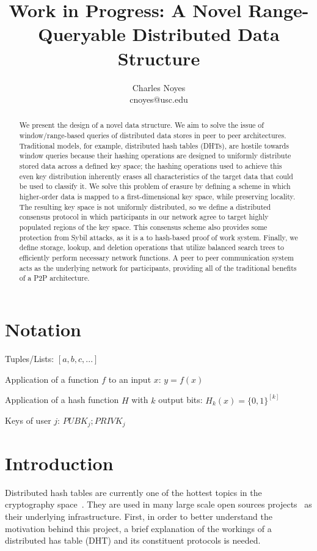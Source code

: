 \documentclass[10pt]{IEEEtran}
\title{Work in Progress: A Novel Range-Queryable Distributed Data Structure}
\author{Charles Noyes \\ cnoyes@usc.edu}
\date{\vspace{-5ex}}
\begin{document}
\maketitle

\begin{abstract}
We present the design of a novel data structure. We aim to solve the issue of window/range-based queries of distributed data stores in peer to peer architectures. Traditional models, for example, distributed hash tables (DHTs), are hostile towards window queries because their hashing operations are designed to uniformly distribute stored data across a defined key space; the hashing operations used to achieve this even key distribution inherently erases all characteristics of the target data that could be used to classify it. We solve this problem of erasure by defining a scheme in which higher-order data is mapped to a first-dimensional key space, while preserving locality. The resulting key space is not uniformly distributed, so we define a distributed consensus protocol in which participants in our network agree to target highly populated regions of the key space. This consensus scheme also provides some protection from Sybil attacks, as it is a to hash-based proof of work system. Finally, we define storage, lookup, and deletion operations that utilize balanced search trees to efficiently perform necessary network functions. A peer to peer communication system acts as the underlying network for participants, providing all of the traditional benefits of a P2P architecture.
\end{abstract}


\section{Notation}

\noindent Tuples/Lists: $[a,b,c,...]$

\noindent Application of a function $f$ to an input $x$: $y=f(x)$

\noindent Application of a hash function $H$ with $k$ output bits: $H_{k}(x) = \{0,1\}^{[k]}$

\noindent Keys of user $j$: $ PUBK_j; PRIVK_j $

 
\section{Introduction}
\par Distributed hash tables are currently one of the hottest topics in the cryptography space~\cite{Stoica:2001dj,Rowstron:2001ea,Ratnasamy:2001wn}. They are used in many large scale open sources projects~\cite{Freitas:2013tb,Xu:2010vs,Perfitt:2010fh} as their underlying infrastructure. First, in order to better understand the motivation behind this project, a brief explanation of the workings of a distributed has table (DHT) and its constituent protocols is needed.
\end{document}
